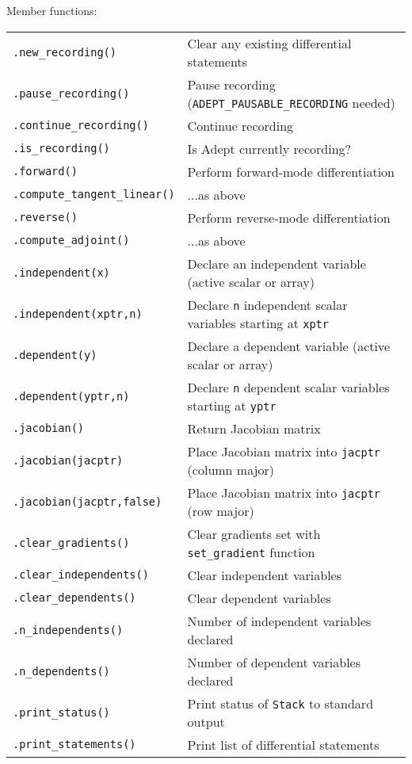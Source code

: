 \documentclass[10pt,a4,landscape]{article}
\def\code#1{\texttt{#1}}
\begin{document}
Member functions:\\
\begin{tabular}{ll}
\code{.new\_recording()} & Clear any existing differential statements\\
\code{.pause\_recording()} & Pause recording (\code{ADEPT\_PAUSABLE\_RECORDING} needed)\\
\code{.continue\_recording()} & Continue recording \\
\code{.is\_recording()} & Is Adept currently recording?\\
\code{.forward()} & Perform forward-mode differentiation\\
\code{.compute\_tangent\_linear()} & ...as above\\
\code{.reverse()} & Perform reverse-mode differentiation\\
\code{.compute\_adjoint()} & ...as above\\
\code{.independent(x)} & Declare an independent variable (active scalar or array)\\
\code{.independent(xptr,n)} & Declare \code{n} independent scalar variables starting at \code{xptr} \\
\code{.dependent(y)} & Declare a dependent variable (active scalar or array)\\
\code{.dependent(yptr,n)} & Declare \code{n} dependent scalar variables starting at \code{yptr}\\
\code{.jacobian()} & Return Jacobian matrix\\
\code{.jacobian(jacptr)} & Place Jacobian matrix into \code{jacptr} (column major)\\
\code{.jacobian(jacptr,false)} & Place Jacobian matrix into \code{jacptr} (row major)\\
\code{.clear\_gradients()} & Clear gradients set with \code{set\_gradient} function \\
\code{.clear\_independents()} & Clear independent variables\\
\code{.clear\_dependents()} & Clear dependent variables\\
\code{.n\_independents()} & Number of independent variables declared \\
\code{.n\_dependents()} & Number of dependent variables declared\\
\code{.print\_status()} & Print status of \code{Stack} to standard output\\
\code{.print\_statements()} & Print list of differential statements\\

\end{tabular}
\end{document}
